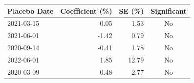 \begin{tabular}{lrrc}
  \toprule
Placebo Date & Coefficient (\%) & SE (\%) & Significant \\
  \midrule
2021-03-15 & 0.05 & 1.53 & No \\ 
  2021-06-01 & -1.42 & 0.79 & No \\ 
  2020-09-14 & -0.41 & 1.78 & No \\ 
  2022-06-01 & 1.85 & 12.79 & No \\ 
  2020-03-09 & 0.48 & 2.77 & No \\ 
   \bottomrule
\end{tabular}
